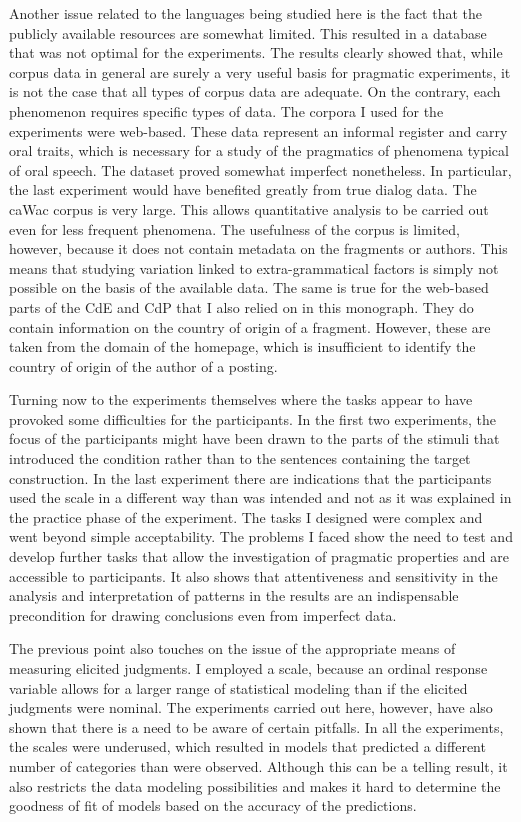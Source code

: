 Another issue related to the languages being studied here is the fact that the publicly available resources are somewhat limited. This resulted in  a database that was not optimal for the experiments. The results  clearly showed that, while corpus data in general are surely a very useful basis for pragmatic experiments, it is not the case that all types of corpus data are adequate. On the contrary, each  phenomenon requires  specific types of data. The corpora I used for the experiments were web-based. These data represent an informal register and carry oral traits,  which is necessary for a study of the pragmatics of phenomena typical of oral speech. The dataset proved somewhat imperfect nonetheless. In particular, the last experiment would have benefited greatly from  true dialog data. The caWac corpus is very large. This allows quantitative analysis to be carried out even for less frequent phenomena. The usefulness of the corpus is limited, however, because it does not contain metadata on the fragments or authors. This means that studying  variation linked to extra-grammatical factors  is simply not possible on the basis of the available data. The same is true for the web-based parts of the CdE and CdP that I also relied on in this monograph.  They do contain information on the country of origin of a fragment. However, these are  taken from the domain of the homepage, which is insufficient to identify the country of origin of the author of a posting.  


Turning now to the experiments themselves where the tasks appear to have provoked some  difficulties for the participants. In the first two experiments, the focus of the participants might have been drawn to the parts of the stimuli that introduced the condition rather than to the  sentences containing the target construction. In the last experiment there are indications that the participants used the scale in a different way  than was intended and not as it was explained in the practice phase of the experiment. The tasks I designed were complex and went beyond simple acceptability. The problems I faced show the need  to test and develop further tasks  that  allow the investigation of pragmatic properties and are accessible to participants.  It also shows that attentiveness and sensitivity in the analysis and interpretation of patterns in the results  are an indispensable precondition for drawing conclusions even from imperfect data.

The previous point also touches on the issue of the appropriate means of measuring elicited judgments. I employed a scale, because an ordinal response variable allows for  a larger range of statistical modeling than if the elicited judgments were nominal. The  experiments carried out here, however, have also shown that there is a need to be aware of certain pitfalls. In all the experiments,  the scales were underused, which resulted in models that predicted a different number of categories than were observed. Although this can be a telling result, it also restricts the data modeling possibilities and makes it hard to determine the goodness of fit of models based on the accuracy of the predictions. 

